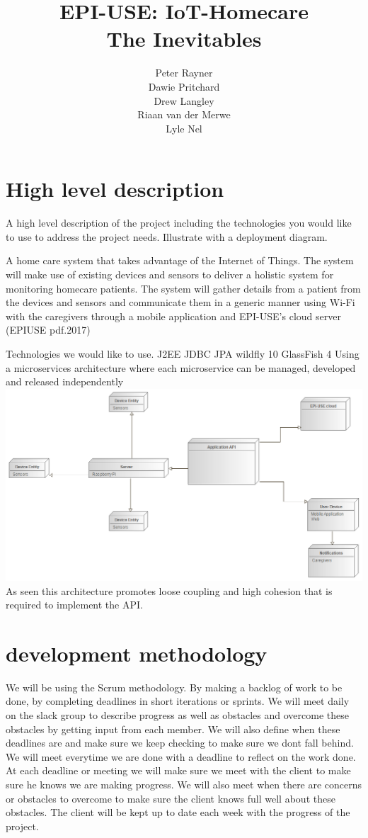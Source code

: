 \documentclass{article}
\title{EPI-USE: IoT-Homecare \\
The Inevitables
}
\author{  
            Peter Rayner\\
            Dawie Pritchard\\
            Drew Langley\\
            Riaan van der Merwe\\
            Lyle Nel\\
        }
\begin{document}
\maketitle

\newpage

\tableofcontents

\newpage


\section{High level description}
A high level description of the project including the technologies you would like to
use to address the project needs. Illustrate with a deployment diagram.

A home care system that takes advantage of the Internet of Things. The system will make use of existing devices and sensors to deliver a holistic system for monitoring homecare patients.
The system will gather details from a patient from the devices and sensors and communicate them in a generic manner using Wi-Fi with the caregivers through a mobile application and EPI-USE's cloud server (EPIUSE pdf.2017)

Technologies we would like to use.
J2EE
JDBC
JPA
wildfly 10
GlassFish 4
Using a microservices architecture where each microservice can be managed, developed and released independently\\
\includegraphics[width=\linewidth]{dd.png}
As seen this architecture promotes loose coupling and high cohesion that is required to implement the API.

\section{development methodology}

We will be using the Scrum methodology. By making a backlog of work to be done, by completing deadlines in short iterations or sprints. We will meet daily on the slack group to describe progress as well as obstacles and overcome these obstacles by getting input from each member. We will also define when these deadlines are and make sure we keep checking to make sure we dont fall behind. We will meet everytime we are done with a deadline to reflect on the work done.
At each deadline or meeting we will make sure we meet with the client to make sure he knows we are making progress. We will also meet when there are concerns or obstacles to overcome to make sure the client knows full well about these obstacles. The client will be kept up to date each week with the progress of the project.
\end{document}
